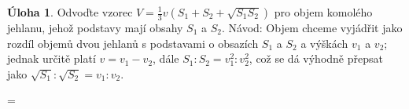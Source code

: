 \documentclass[9pt,a5paper]{extarticle}
\theoremstyle{definition}
\newtheorem{uloha}{Úloha}
\def\vysld{}
\let\printvysl\relax
\begin{document}
\begin{uloha}
Odvoďte vzorec $V = \frac13 v (S_1 + S_2 + \sqrt{S_1 S_2})$ pro objem komolého jehlanu, jehož podstavy mají obsahy $S_1$ a $S_2$. Návod: Objem chceme vyjádřit jako rozdíl objemů dvou jehlanů s podstavami o obsazích $S_1$ a $S_2$ a výškách $v_1$ a $v_2$; jednak určitě platí $v = v_1 - v_2$, dále $S_1 : S_2 = v_1^2 : v_2^2$, což se dá výhodně přepsat jako $\sqrt{S_1} : \sqrt{S_2} = v_1 : v_2$.
\end{uloha}


\newpage
\parindent=0pt
\parskip=\smallskipamount
\def\printvysl#1#2{\textbf{#1.}\ #2\par}
\vysld
\end{document}
